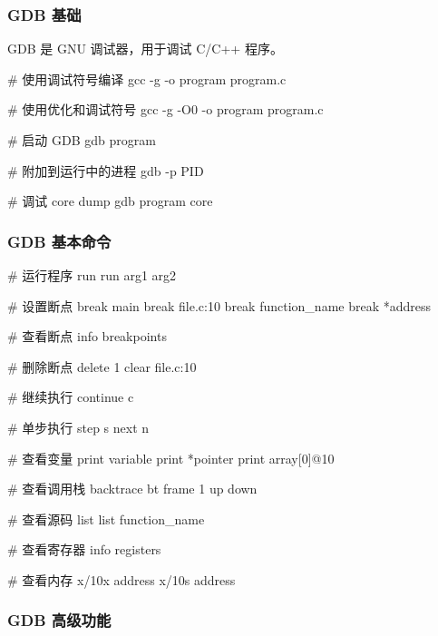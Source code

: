 \subsubsection{GDB 基础}

GDB 是 GNU 调试器，用于调试 C/C++ 程序。


\begin{lstcode}[numbers=none]
  # 使用调试符号编译
  gcc -g -o program program.c

  # 使用优化和调试符号
  gcc -g -O0 -o program program.c
\end{lstcode}


\begin{lstcode}[numbers=none]
  # 启动 GDB
  gdb program

  # 附加到运行中的进程
  gdb -p PID

  # 调试 core dump
  gdb program core
\end{lstcode}

\subsubsection{GDB 基本命令}


\begin{lstcode}[numbers=none]
  # 运行程序
  run
  run arg1 arg2

  # 设置断点
  break main
  break file.c:10
  break function_name
  break *address

  # 查看断点
  info breakpoints

  # 删除断点
  delete 1
  clear file.c:10

  # 继续执行
  continue
  c

  # 单步执行
  step
  s
  next
  n

  # 查看变量
  print variable
  print *pointer
  print array[0]@10

  # 查看调用栈
  backtrace
  bt
  frame 1
  up
  down

  # 查看源码
  list
  list function_name

  # 查看寄存器
  info registers

  # 查看内存
  x/10x address
  x/10s address
\end{lstcode}

\subsubsection{GDB 高级功能}

